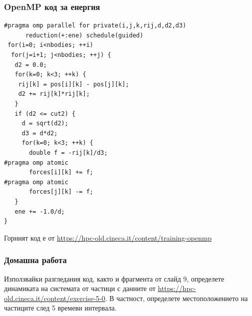 \documentclass{beamer}
\begin{document}
\begin{frame}
  \frametitle{OpenMP код за енергия}
\scriptsize
\begin{verbatim}
#pragma omp parallel for private(i,j,k,rij,d,d2,d3) 
      reduction(+:ene) schedule(guided)
 for(i=0; i<nbodies; ++i)
  for(j=i+1; j<nbodies; ++j) {
   d2 = 0.0;
   for(k=0; k<3; ++k) {
    rij[k] = pos[i][k] - pos[j][k];
    d2 += rij[k]*rij[k];
   }
   if (d2 <= cut2) {
     d = sqrt(d2);
     d3 = d*d2;
     for(k=0; k<3; ++k) {
       double f = -rij[k]/d3;
#pragma omp atomic
       forces[i][k] += f;
#pragma omp atomic
       forces[j][k] -= f;
   }
   ene += -1.0/d;
}
\end{verbatim}
\end{frame}


\begin{frame}[fragile]{}
  Горният код е от
  \url{https://hpc-old.cineca.it/content/training-openmp}
\end{frame}

\begin{frame}
  \frametitle{Домашна работа}
  Използвайки разгледания код, както и фрагмента от слайд 9,
  определете динамиката на системата от частици с данните от
  \url{https://hpc-old.cineca.it/content/exercise-5-0}. В частност,
  определете местоположението на частиците след 5 времеви интервала.
\end{frame}
\end{document}
